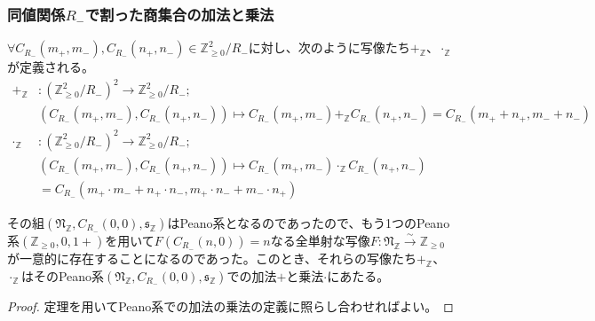 \documentclass[dvipdfmx]{jsarticle}
\begin{document}
\subsubsection{同値関係$R_{-}$で割った商集合の加法と乗法}%
\begin{dfn}
$\forall C_{R_{-}}\left( m_{+},m_{-} \right),C_{R_{-}}\left( n_{+},n_{-} \right) \in \mathbb{Z}_{\geq 0}^{2} /R_{-} $に対し、次のように写像たち$+_{\mathbb{Z}}$、$\cdot_{\mathbb{Z}}$が定義される。
\begin{align*}
+_{\mathbb{Z}}&:\left( \mathbb{Z}_{\geq 0}^{2} /R_{-}  \right)^{2} \rightarrow \mathbb{Z}_{\geq 0}^{2} /R_{-} ;\\
&\left( C_{R_{-}}\left( m_{+},m_{-} \right),C_{R_{-}}\left( n_{+},n_{-} \right) \right) \mapsto C_{R_{-}}\left( m_{+},m_{-} \right) +_{\mathbb{Z}}C_{R_{-}}\left( n_{+},n_{-} \right) = C_{R_{-}}\left( m_{+} + n_{+},m_{-} + n_{-} \right)\\
\cdot_{\mathbb{Z}}&:\left( \mathbb{Z}_{\geq 0}^{2} /R_{-}  \right)^{2} \rightarrow \mathbb{Z}_{\geq 0}^{2} /R_{-} ;\\
&\left( C_{R_{-}}\left( m_{+},m_{-} \right),C_{R_{-}}\left( n_{+},n_{-} \right) \right) \mapsto C_{R_{-}}\left( m_{+},m_{-} \right) \cdot_{\mathbb{Z}}C_{R_{-}}\left( n_{+},n_{-} \right) \\
&= C_{R_{-}}\left( m_{+} \cdot m_{-} + n_{+} \cdot n_{-},m_{+} \cdot n_{-} + m_{-} \cdot n_{+} \right)
\end{align*}
\end{dfn}
\begin{thm}\label{1.2.6.5}
その組$\left( \mathfrak{N}_{\mathbb{Z}},C_{R_{-}}(0,0),\mathfrak{s}_{\mathbb{Z}} \right)$はPeano系となるのであったので、もう1つのPeano系$\left( \mathbb{Z}_{\geq 0},0,1 + \right)$を用いて$F\left( C_{R_{-}}(n,0) \right) = n$なる全単射な写像$F:\mathfrak{N}_{\mathbb{Z}}\overset{\sim}{\rightarrow}\mathbb{Z}_{\geq 0}$が一意的に存在することになるのであった。このとき、それらの写像たち$+_{\mathbb{Z}}$、$\cdot_{\mathbb{Z}}$はそのPeano系$\left( \mathfrak{N}_{\mathbb{Z}},C_{R_{-}}(0,0),\mathfrak{s}_{\mathbb{Z}} \right)$での加法$+$と乗法$\cdot$にあたる。
\end{thm}
\begin{proof}
定理を用いてPeano系での加法の乗法の定義に照らし合わせればよい。
\end{proof}
\end{document}
